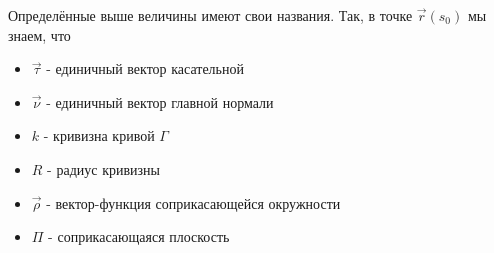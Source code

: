 \begin{definition}
	Определённые выше величины имеют свои названия. Так, в точке $\vec{r}(s_0)$ мы знаем, что
	\begin{itemize}
		\item $\vec{\tau}$ - единичный вектор касательной
		
		\item $\vec{\nu}$ - единичный вектор главной нормали
		
		\item $k$ - кривизна кривой $\Gamma$
		
		\item $R$ - радиус кривизны
		
		\item $\vec{\rho}$ - вектор-функция соприкасающейся окружности
		
		\item $\Pi$ - соприкасающаяся плоскость
	\end{itemize}
\end{definition}

